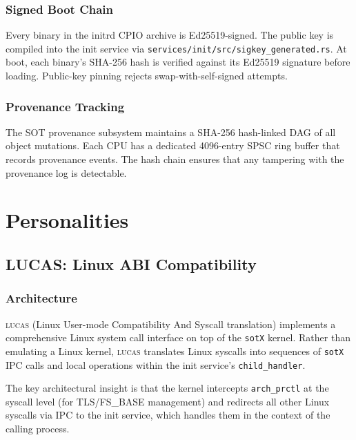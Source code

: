 \documentclass[11pt,a4paper,twoside]{report}
\theoremstyle{definition}
\newcommand{\sotX}{\texttt{sotX}}
\newcommand{\sotX}{\texttt{sotX}}
\newcommand{\LUCAS}{\textsc{lucas}}
\newcommand{\file}[1]{\texttt{#1}}
\begin{document}
\section{Signed Boot Chain}

Every binary in the initrd CPIO archive is Ed25519-signed. The public key
is compiled into the init service via
\file{services/init/src/sigkey\_generated.rs}. At boot, each binary's SHA-256
hash is verified against its Ed25519 signature before loading. Public-key
pinning rejects swap-with-self-signed attempts.

\section{Provenance Tracking}

The SOT provenance subsystem maintains a SHA-256 hash-linked DAG of all
object mutations. Each CPU has a dedicated 4096-entry SPSC ring buffer that
records provenance events. The hash chain ensures that any tampering with
the provenance log is detectable.


\part{Personalities}

\chapter{LUCAS: Linux ABI Compatibility}
\label{ch:lucas}

\section{Architecture}

\LUCAS{} (Linux User-mode Compatibility And Syscall translation) implements
a comprehensive Linux system call interface on top of the \sotX{} kernel.
Rather than emulating a Linux kernel, \LUCAS{} translates Linux syscalls
into sequences of \sotX{} IPC calls and local operations within the init
service's \texttt{child\_handler}.

The key architectural insight is that the kernel intercepts
\texttt{arch\_prctl} at the syscall level (for TLS/FS\_BASE management) and
redirects all other Linux syscalls via IPC to the init service, which
handles them in the context of the calling process.
\end{document}

